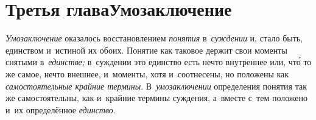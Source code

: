\chapter[Третья глава Умозаключение]{Третья глава\newline Умозаключение}

{\em Умозаключение} оказалось восстановлением {\em понятия} в~{\em суждении}
и, стало быть, единством и~истиной их обоих. Понятие как таковое держит свои
моменты снятыми в~{\em единстве;} в~суждении это единство есть нечто внутреннее
или, чт\'{о} то же самое, нечто внешнее, и~моменты, хотя и~соотнесены, но положены
как {\em самостоятельные крайние термины}. В~{\em умозаключении} определения
понятия так же самостоятельны, как и~крайние термины суждения, а~вместе с~тем
положено и~их определённое {\em единство}.

